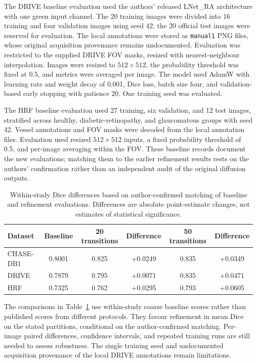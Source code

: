 \documentclass[jimaging,article,submit,pdftex,moreauthors]
  {Definitions/mdpi}
\begin{document}
The DRIVE baseline evaluation used the authors' released LNet\_RA architecture with one green input channel. The 20 training images were divided into 16 training and four validation images using seed 42; the 20 official test images were reserved for evaluation. The local annotations were stored as \texttt{manual1} PNG files, whose original acquisition provenance remains undocumented. Evaluation was restricted to the supplied DRIVE FOV masks, resized with nearest-neighbour interpolation. Images were resized to $512\times512$, the probability threshold was fixed at 0.5, and metrics were averaged per image. The model used AdamW with learning rate and weight decay of 0.001, Dice loss, batch size four, and validation-based early stopping with patience 20. One training seed was evaluated.

The HRF baseline evaluation used 27 training, six validation, and 12 test images, stratified across healthy, diabetic-retinopathy, and glaucomatous groups with seed 42. Vessel annotations and FOV masks were decoded from the local annotation files. Evaluation used resized $512\times512$ inputs, a fixed probability threshold of 0.5, and per-image averaging within the FOV. These baseline records document the new evaluations; matching them to the earlier refinement results rests on the authors' confirmation rather than an independent audit of the original diffusion outputs.

\begin{table}[htbp]
\centering
\caption{Within-study Dice differences based on author-confirmed matching of baseline and refinement evaluations. Differences are absolute point-estimate changes, not estimates of statistical significance.}
\label{tab:baseline_comparison}
\begin{tabular}{lccccc}
\toprule
Dataset & Baseline & 20 transitions & Difference & 50 transitions & Difference \\
\midrule
CHASE-DB1 & 0.8001 & 0.825 & +0.0249 & 0.835 & +0.0349 \\
DRIVE & 0.7879 & 0.795 & +0.0071 & 0.835 & +0.0471 \\
HRF & 0.7325 & 0.762 & +0.0295 & 0.793 & +0.0605 \\
\bottomrule
\end{tabular}
\end{table}

The comparisons in Table~\ref{tab:baseline_comparison} use within-study coarse baseline scores rather than published scores from different protocols. They favour refinement in mean Dice on the stated partitions, conditional on the author-confirmed matching. Per-image paired differences, confidence intervals, and repeated training runs are still needed to assess robustness. The single training seed and undocumented acquisition provenance of the local DRIVE annotations remain limitations.
\end{document}
